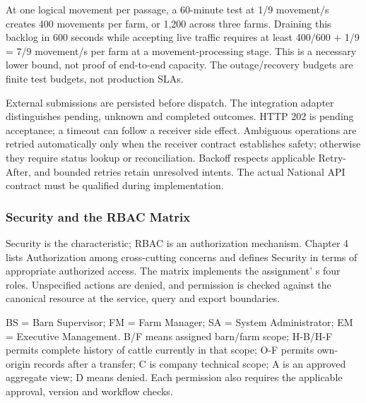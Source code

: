 At one logical movement per passage, a 60-minute test at 1/9 movement/s
creates 400 movements per farm, or 1,200 across three farms. Draining
this backlog in 600 seconds while accepting live traffic requires at
least 400/600 + 1/9 = 7/9 movement/s per farm at a movement-processing
stage. This is a necessary lower bound, not proof of end-to-end
capacity. The outage/recovery budgets are finite test budgets, not
production SLAs.

External submissions are persisted before dispatch. The integration
adapter distinguishes pending, unknown and completed outcomes. HTTP 202
is pending acceptance; a timeout can follow a receiver side effect.
Ambiguous operations are retried automatically only when the receiver
contract establishes safety; otherwise they require status lookup or
reconciliation. Backoff respects applicable Retry-After, and bounded
retries retain unresolved intents. The actual National API
contract must be qualified during implementation.

\subsubsection{Security and the RBAC Matrix}\label{sec:2.2.3}

Security is the characteristic; RBAC is an authorization mechanism.
Chapter 4 lists Authorization among cross-cutting concerns and defines
Security in terms of appropriate authorized access.
The matrix implements the assignment' s four
roles. Unspecified actions are denied, and permission is checked against
the canonical resource at the service, query and export boundaries.

BS = Barn Supervisor; FM = Farm Manager; SA = System Administrator; EM =
Executive Management. B/F means assigned barn/farm scope; H-B/H-F
permits complete history of cattle currently in that scope; O-F permits
own-origin records after a transfer; C is company technical scope; A is
an approved aggregate view; D means denied. Each permission also
requires the applicable approval, version and workflow checks.

